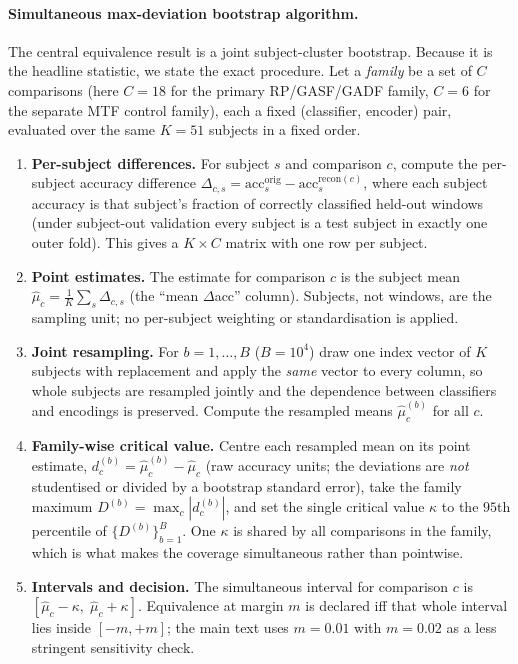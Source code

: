 \documentclass[10pt,a4paper,parskip=half-]{scrartcl}
\begin{document}
\paragraph*{Simultaneous max-deviation bootstrap algorithm.}
The central equivalence result is a joint subject-cluster bootstrap. Because it is the headline statistic, we state the exact procedure. Let a \emph{family} be a set of $C$ comparisons (here $C=18$ for the primary RP/GASF/GADF family, $C=6$ for the separate MTF control family), each a fixed (classifier, encoder) pair, evaluated over the same $K=51$ subjects in a fixed order.
\begin{enumerate}
\item \textbf{Per-subject differences.} For subject $s$ and comparison $c$, compute the per-subject accuracy difference $\Delta_{c,s}=\mathrm{acc}^{\mathrm{orig}}_{s}-\mathrm{acc}^{\mathrm{recon}(c)}_{s}$, where each subject accuracy is that subject's fraction of correctly classified held-out windows (under subject-out validation every subject is a test subject in exactly one outer fold). This gives a $K\times C$ matrix with one row per subject.
\item \textbf{Point estimates.} The estimate for comparison $c$ is the subject mean $\hat\mu_c=\frac1K\sum_s\Delta_{c,s}$ (the ``mean $\Delta$acc'' column). Subjects, not windows, are the sampling unit; no per-subject weighting or standardisation is applied.
\item \textbf{Joint resampling.} For $b=1,\dots,B$ ($B=10^4$) draw one index vector of $K$ subjects with replacement and apply the \emph{same} vector to every column, so whole subjects are resampled jointly and the dependence between classifiers and encodings is preserved. Compute the resampled means $\hat\mu^{(b)}_c$ for all $c$.
\item \textbf{Family-wise critical value.} Centre each resampled mean on its point estimate, $d^{(b)}_c=\hat\mu^{(b)}_c-\hat\mu_c$ (raw accuracy units; the deviations are \emph{not} studentised or divided by a bootstrap standard error), take the family maximum $D^{(b)}=\max_c|d^{(b)}_c|$, and set the single critical value $\kappa$ to the $95$th percentile of $\{D^{(b)}\}_{b=1}^{B}$. One $\kappa$ is shared by all comparisons in the family, which is what makes the coverage simultaneous rather than pointwise.
\item \textbf{Intervals and decision.} The simultaneous interval for comparison $c$ is $[\hat\mu_c-\kappa,\;\hat\mu_c+\kappa]$. Equivalence at margin $m$ is declared iff that whole interval lies inside $[-m,+m]$; the main text uses $m=0.01$ with $m=0.02$ as a less stringent sensitivity check.
\end{enumerate}
\end{document}

